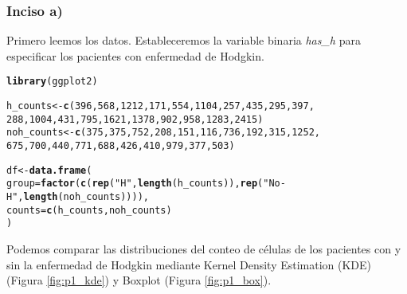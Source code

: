 \documentclass[paper=letter, fontsize=11pt]{scrartcl}\usepackage[]{graphicx}\usepackage[]{xcolor}
\makeatletter
\newcommand{\hlnum}[1]{\textcolor[rgb]{0.686,0.059,0.569}{#1}}%
\newcommand{\hlsng}[1]{\textcolor[rgb]{0.192,0.494,0.8}{#1}}%
\newcommand{\hldef}[1]{\textcolor[rgb]{0.345,0.345,0.345}{#1}}%
\newcommand{\hlkwb}[1]{\textcolor[rgb]{0.69,0.353,0.396}{#1}}%
\newcommand{\hlkwc}[1]{\textcolor[rgb]{0.333,0.667,0.333}{#1}}%
\newcommand{\hlkwd}[1]{\textcolor[rgb]{0.737,0.353,0.396}{\textbf{#1}}}%
\newenvironment{kframe}{%
 \def\at@end@of@kframe{}%
 \ifinner\ifhmode%
  \def\at@end@of@kframe{\end{minipage}}%
  \begin{minipage}{\columnwidth}%
 \fi\fi%
 \def\FrameCommand##1{\hskip\@totalleftmargin \hskip-\fboxsep
 \colorbox{shadecolor}{##1}\hskip-\fboxsep
     \hskip-\linewidth \hskip-\@totalleftmargin \hskip\columnwidth}%
 \MakeFramed {\advance\hsize-\width
   \@totalleftmargin\z@ \linewidth\hsize
   \@setminipage}}%
 {\par\unskip\endMakeFramed%
 \at@end@of@kframe}
\newenvironment{knitrout}{}{} %
\numberwithin{equation}{problemcounter} %
\numberwithin{figure}{problemcounter} %
\numberwithin{table}{problemcounter} %
\numberwithin{subsection}{problemcounter}
\makeatother
\begin{document}
\subsubsection*{Inciso a)}

Primero leemos los datos. Estableceremos la variable binaria \textit{has\_h} para especificar los pacientes con enfermedad de Hodgkin.

\begin{knitrout}
\color{fgcolor}\begin{kframe}
\begin{alltt}
\hlkwd{library}\hldef{(ggplot2)}

\hldef{h_counts} \hlkwb{<-} \hlkwd{c}\hldef{(}\hlnum{396}\hldef{,} \hlnum{568}\hldef{,} \hlnum{1212}\hldef{,} \hlnum{171}\hldef{,} \hlnum{554}\hldef{,} \hlnum{1104}\hldef{,} \hlnum{257}\hldef{,} \hlnum{435}\hldef{,} \hlnum{295}\hldef{,} \hlnum{397}\hldef{,}
              \hlnum{288}\hldef{,} \hlnum{1004}\hldef{,} \hlnum{431}\hldef{,} \hlnum{795}\hldef{,} \hlnum{1621}\hldef{,} \hlnum{1378}\hldef{,} \hlnum{902}\hldef{,} \hlnum{958}\hldef{,} \hlnum{1283}\hldef{,} \hlnum{2415}\hldef{)}
\hldef{noh_counts} \hlkwb{<-} \hlkwd{c}\hldef{(}\hlnum{375}\hldef{,} \hlnum{375}\hldef{,} \hlnum{752}\hldef{,} \hlnum{208}\hldef{,} \hlnum{151}\hldef{,} \hlnum{116}\hldef{,} \hlnum{736}\hldef{,} \hlnum{192}\hldef{,} \hlnum{315}\hldef{,} \hlnum{1252}\hldef{,}
                \hlnum{675}\hldef{,} \hlnum{700}\hldef{,} \hlnum{440}\hldef{,} \hlnum{771}\hldef{,} \hlnum{688}\hldef{,} \hlnum{426}\hldef{,} \hlnum{410}\hldef{,} \hlnum{979}\hldef{,} \hlnum{377}\hldef{,} \hlnum{503}\hldef{)}

\hldef{df} \hlkwb{<-} \hlkwd{data.frame}\hldef{(}
\hlkwc{group} \hldef{=} \hlkwd{factor}\hldef{(}\hlkwd{c}\hldef{(}\hlkwd{rep}\hldef{(}\hlsng{"H"}\hldef{,} \hlkwd{length}\hldef{(h_counts)),} \hlkwd{rep}\hldef{(}\hlsng{"No-H"}\hldef{,} \hlkwd{length}\hldef{(noh_counts)))),}
  \hlkwc{counts} \hldef{=} \hlkwd{c}\hldef{(h_counts, noh_counts)}
\hldef{)}
\end{alltt}
\end{kframe}
\end{knitrout}

Podemos comparar las distribuciones del conteo de células de los pacientes con y sin la enfermedad de Hodgkin mediante Kernel Density Estimation (KDE) (Figura \ref{fig:p1_kde}) y Boxplot (Figura \ref{fig:p1_box}).
\end{document}
